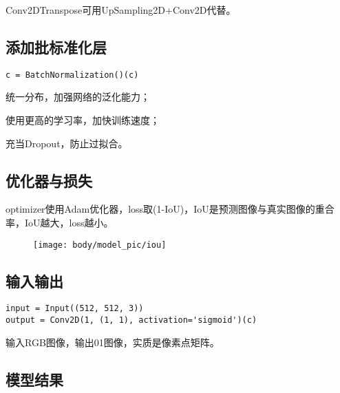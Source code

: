 Conv2DTranspose可用UpSampling2D+Conv2D代替。

\subsection{添加批标准化层}

\begin{verbatim}
c = BatchNormalization()(c)
\end{verbatim}

统一分布，加强网络的泛化能力；

使用更高的学习率，加快训练速度；

充当Dropout，防止过拟合。

\subsection{优化器与损失}

optimizer使用Adam优化器，loss取(1-IoU)，IoU是预测图像与真实图像的重合率，IoU越大，loss越小。

\begin{figure}
\centering
\texttt{[image: body/model\_pic/iou]}
\caption{}
\end{figure}

\subsection{输入输出}

\begin{verbatim}
input = Input((512, 512, 3))
output = Conv2D(1, (1, 1), activation='sigmoid')(c)
\end{verbatim}

输入RGB图像，输出01图像，实质是像素点矩阵。

\subsection{模型结果}

